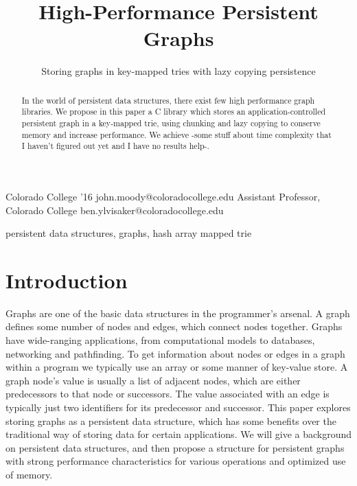 \documentclass[preprint]{sigplanconf}
\begin{document}
\setlength{\pdfpageheight}{\paperheight}
\setlength{\pdfpagewidth}{\paperwidth}




\title{High-Performance Persistent Graphs}
\subtitle{Storing graphs in key-mapped tries with lazy copying persistence}

           {Colorado College '16}
           {john.moody@coloradocollege.edu}
           {Assistant Professor, Colorado College}
           {ben.ylvisaker@coloradocollege.edu}

\maketitle

\begin{abstract}
In the world of persistent data structures, there exist few high performance graph libraries.
We propose in this paper a C library which stores an application-controlled persistent graph in a key-mapped trie, using chunking and lazy copying to conserve memory and increase performance.
We achieve -some stuff about time complexity that I haven't figured out yet and I have no results help-.
\end{abstract}


\keywords
persistent data structures, graphs, hash array mapped trie

\section{Introduction}
Graphs are one of the basic data structures in the programmer's arsenal.
A graph defines some number of nodes and edges, which connect nodes together.
Graphs have wide-ranging applications, from computational models to databases, networking and pathfinding.
To get information about nodes or edges in a graph within a program we typically use an array or some manner of key-value store.
A graph node's value is usually a list of adjacent nodes, which are either predecessors to that node or successors.
The value associated with an edge is typically just two identifiers for its predecessor and successor.
This paper explores storing graphs as a persistent data structure, which has some benefits over the traditional way of storing data for certain applications.
We will give a background on persistent data structures, and then propose a structure for persistent graphs with strong performance characteristics for various operations and optimized use of memory.
\end{document}
